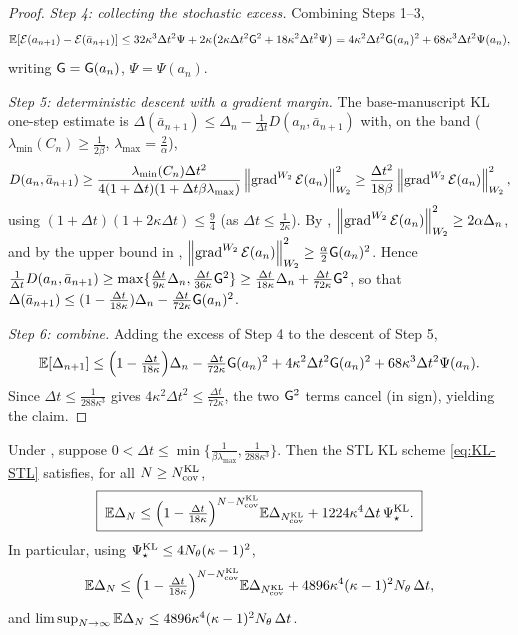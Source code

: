 \begin{proof}
\emph{Step 4: collecting the stochastic excess.} Combining Steps 1--3,
\[
    \mathbb{E}[\mathcal{E}(a_{n+1})-\mathcal{E}(\bar a_{n+1})]
    \leq
    32\kappa^3\Delta t^2\Psi+2\kappa\bigl(2\kappa\Delta t^2\mathsf{G}^2+18\kappa^2\Delta t^2\Psi\bigr)
    =
    4\kappa^2\Delta t^2\mathsf{G}(a_n)^2+68\kappa^3\Delta t^2\Psi(a_n),
\]
writing $\mathsf{G}=\mathsf{G}(a_n)$, $\Psi=\Psi(a_n)$.

\emph{Step 5: deterministic descent with a gradient margin.} The base-manuscript KL
one-step estimate is $\Delta(\bar a_{n+1})\leq\Delta_n-\tfrac1{\Delta t}D(a_n,\bar a_{n+1})$
with, on the band ($\lambda_{\min}(C_n)\geq\tfrac1{2\beta}$, $\lambda_{\max}=\tfrac2\alpha$),
\[
    D(a_n,\bar a_{n+1})
    \geq
    \frac{\lambda_{\min}(C_n)\Delta t^2}{4(1+\Delta t)(1+\Delta t\beta\lambda_{\max})}
    \left\lVert \operatorname{grad}^{W_2}\mathcal{E}(a_n)\right\rVert_{W_2}^2
    \geq
    \frac{\Delta t^2}{18\beta}\left\lVert \operatorname{grad}^{W_2}\mathcal{E}(a_n)\right\rVert_{W_2}^2,
\]
using $(1+\Delta t)(1+2\kappa\Delta t)\leq\tfrac94$ (as $\Delta t\leq\tfrac1{2\kappa}$). By
, $\left\lVert \operatorname{grad}^{W_2}\mathcal{E}(a_n)\right\rVert_{W_2}^2\geq2\alpha\Delta_n$, and by the
upper bound in , $\left\lVert \operatorname{grad}^{W_2}\mathcal{E}(a_n)\right\rVert_{W_2}^2\geq\tfrac\alpha2\mathsf{G}(a_n)^2$.
Hence $\tfrac1{\Delta t}D(a_n,\bar a_{n+1})\geq\max\{\tfrac{\Delta t}{9\kappa}\Delta_n,\tfrac{\Delta t}{36\kappa}\mathsf{G}^2\}\geq\tfrac{\Delta t}{18\kappa}\Delta_n+\tfrac{\Delta t}{72\kappa}\mathsf{G}^2$,
so that
$\Delta(\bar a_{n+1})\leq(1-\tfrac{\Delta t}{18\kappa})\Delta_n-\tfrac{\Delta t}{72\kappa}\mathsf{G}(a_n)^2$.

\emph{Step 6: combine.} Adding the excess of Step 4 to the descent of Step 5,
\[
    \mathbb{E}[\Delta_{n+1}]
    \leq
    \Bigl(1-\tfrac{\Delta t}{18\kappa}\Bigr)\Delta_n
    -\tfrac{\Delta t}{72\kappa}\mathsf{G}(a_n)^2
    +4\kappa^2\Delta t^2\mathsf{G}(a_n)^2
    +68\kappa^3\Delta t^2\Psi(a_n).
\]
Since $\Delta t\leq\tfrac1{288\kappa^3}$ gives $4\kappa^2\Delta t^2\leq\tfrac{\Delta t}{72\kappa}$,
the two $\mathsf{G}^2$ terms cancel (in sign), yielding the claim.
\end{proof}

\begin{theorem}
\label{thm:KL-STL-global}
Under , suppose
$0<\Delta t\leq\min\{\frac1{\beta\lambda_{\max}},\frac1{288\kappa^3}\}$.
Then the STL KL scheme \eqref{eq:KL-STL} satisfies, for all $N\geq N_{\mathrm{cov}}^{\mathrm{KL}}$,
\[
    \boxed{\;
    \mathbb{E}\Delta_N
    \leq
    \Bigl(1-\tfrac{\Delta t}{18\kappa}\Bigr)^{N-N_{\mathrm{cov}}^{\mathrm{KL}}}\mathbb{E}\Delta_{N_{\mathrm{cov}}^{\mathrm{KL}}}
    +
    1224\kappa^4\Delta t\,\Psi_\star^{\mathrm{KL}}.
    \;}
\]
In particular, using $\Psi_\star^{\mathrm{KL}}\leq4N_\theta(\kappa-1)^2$,
\[
    \mathbb{E}\Delta_N
    \leq
    \Bigl(1-\tfrac{\Delta t}{18\kappa}\Bigr)^{N-N_{\mathrm{cov}}^{\mathrm{KL}}}\mathbb{E}\Delta_{N_{\mathrm{cov}}^{\mathrm{KL}}}
    +
    4896\kappa^4(\kappa-1)^2N_\theta\,\Delta t,
\]
and $\limsup_{N\to\infty}\mathbb{E}\Delta_N\leq4896\kappa^4(\kappa-1)^2N_\theta\,\Delta t$.
\end{theorem}

